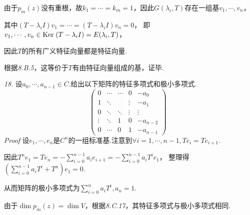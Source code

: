 由于\(p_m(z)\)没有重根，故\(k_1=\cdots=k_m=1\)，因此\(G(\lambda_i,T)\)存在一组基\(v_1,\cdots,v_n\)，

其中\((T-\lambda_i I)v_1=\cdots=(T-\lambda_i I)v_n=0\)，
即\(v_1,\cdots,v_n \in \mathrm{Ker \;} (T-\lambda_i I)=E(\lambda_i,T)\)，

因此\(T\)的所有广义特征向量都是特征向量.

根据\textit{8.B.5}，这等价于\(T\)有由特征向量组成的基，证毕.

\hspace*{\fill}

\textit{18.}
设\(a_0,\cdots,a_{n-1} \in C\).给出以下矩阵的特征多项式和极小多项式.
    \begin{equation*}
        \begin{pmatrix}
            0      & \cdots & \cdots & 0      & -a_0     \\
            1      & \ddots  &        & \vdots & -a_1     \\
            0      & \ddots & \ddots & \vdots & \vdots   \\
            \vdots & \ddots & 1      & 0      & -a_{n-2} \\
            0      & \cdots & 0      & 1      & -a_{n-1} 
        \end{pmatrix}
    \end{equation*}
\textit{Proof}
设\(e_1,\cdots,e_n\)是\(C^n\)的一组标准基.注意到\(\forall i=1,\cdots,n-1,Te_i=Te_{i+1}\).

因此\(T^n e_1=Te_n=-\sum_{i=0}^{n-1}a_ie_{i+1}=-\sum_{i=0}^{n-1}a_iT^ie_1\)，
整理得\((\sum_{i=0}^{n-1}a_iT^i+T^n)e_1=0\).

从而矩阵的极小多项式为\(\sum_{i=0}^n a_iT^i,a_n=1\).

由于\(\dim p_m(z)=\dim V\)，根据\textit{8.C.17}，其特征多项式与极小多项式相同.

